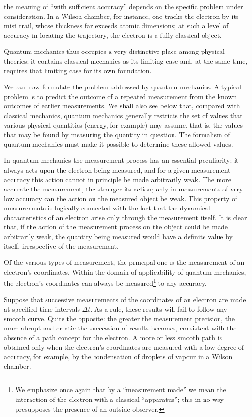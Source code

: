 the meaning of ``with sufficient accuracy'' depends on the specific problem
under consideration. In a Wilson chamber, for instance, one tracks the
electron by its mist trail, whose thickness far exceeds atomic dimensions;
at such a level of accuracy in locating the trajectory, the electron is a
fully classical object.

Quantum mechanics thus occupies a very distinctive place among physical
theories: it contains classical mechanics as its limiting case and, at the
same time, requires that limiting case for its own foundation.

We can now formulate the problem addressed by quantum mechanics. A typical
problem is to predict the outcome of a repeated measurement from the known
outcomes of earlier measurements. We shall also see below that, compared with
classical mechanics, quantum mechanics generally restricts the set of values
that various physical quantities (energy, for example) may assume, that is,
the values that may be found by measuring the quantity in question. The
formalism of quantum mechanics must make it possible to determine these
allowed values.

In quantum mechanics the measurement process has an essential peculiarity: it
always acts upon the electron being measured, and for a given measurement
accuracy this action cannot in principle be made arbitrarily weak. The more
accurate the measurement, the stronger its action; only in measurements of
very low accuracy can the action on the measured object be weak. This property
of measurements is logically connected with the fact that the dynamical
characteristics of an electron arise only through the measurement itself. It
is clear that, if the action of the measurement process on the object could be
made arbitrarily weak, the quantity being measured would have a definite value
by itself, irrespective of the measurement.

Of the various types of measurement, the principal one is the measurement of
an electron's coordinates. Within the domain of applicability of
quantum mechanics, the electron's coordinates can always be
measured\footnote{We emphasize once again that by a ``measurement made'' we
mean the interaction of the electron with a classical ``apparatus''; this in
no way presupposes the presence of an outside observer.} to any accuracy.

Suppose that successive measurements of the coordinates%
of an electron are made at specified time intervals $\Delta t$. As a rule,
these results will fail to follow any smooth curve. Quite the opposite:
the greater the measurement precision, the more abrupt and erratic
the succession of results becomes, consistent with the absence of a path
concept for the electron. A more or less smooth path is obtained only when the
electron's coordinates are measured with a low degree of accuracy, for
example, by the condensation of droplets of vapour in a Wilson chamber.


